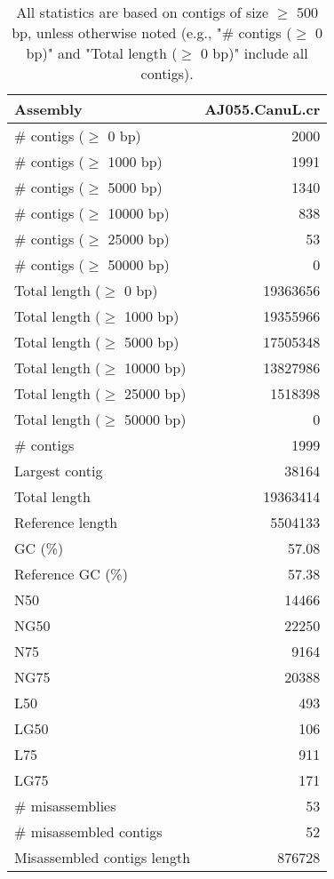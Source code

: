 \documentclass[12pt,a4paper]{article}
\begin{document}
\begin{table}[ht]
\begin{center}
\caption{All statistics are based on contigs of size $\geq$ 500 bp, unless otherwise noted (e.g., "\# contigs ($\geq$ 0 bp)" and "Total length ($\geq$ 0 bp)" include all contigs).}
\begin{tabular}{|l*{1}{|r}|}
\hline
Assembly & AJ055.CanuL.cr \\ \hline
\# contigs ($\geq$ 0 bp) & 2000 \\ \hline
\# contigs ($\geq$ 1000 bp) & 1991 \\ \hline
\# contigs ($\geq$ 5000 bp) & 1340 \\ \hline
\# contigs ($\geq$ 10000 bp) & 838 \\ \hline
\# contigs ($\geq$ 25000 bp) & 53 \\ \hline
\# contigs ($\geq$ 50000 bp) & 0 \\ \hline
Total length ($\geq$ 0 bp) & 19363656 \\ \hline
Total length ($\geq$ 1000 bp) & 19355966 \\ \hline
Total length ($\geq$ 5000 bp) & 17505348 \\ \hline
Total length ($\geq$ 10000 bp) & 13827986 \\ \hline
Total length ($\geq$ 25000 bp) & 1518398 \\ \hline
Total length ($\geq$ 50000 bp) & 0 \\ \hline
\# contigs & 1999 \\ \hline
Largest contig & 38164 \\ \hline
Total length & 19363414 \\ \hline
Reference length & 5504133 \\ \hline
GC (\%) & 57.08 \\ \hline
Reference GC (\%) & 57.38 \\ \hline
N50 & 14466 \\ \hline
NG50 & 22250 \\ \hline
N75 & 9164 \\ \hline
NG75 & 20388 \\ \hline
L50 & 493 \\ \hline
LG50 & 106 \\ \hline
L75 & 911 \\ \hline
LG75 & 171 \\ \hline
\# misassemblies & 53 \\ \hline
\# misassembled contigs & 52 \\ \hline
Misassembled contigs length & 876728 \\ \hline

\end{tabular}
\end{center}
\end{table}
\end{document}
